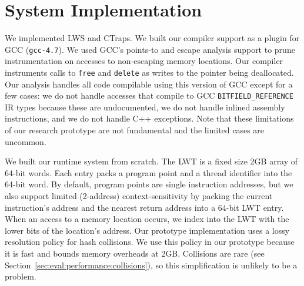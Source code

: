 \documentclass[10pt,nocopyrightspace]{sigplanconf}
\newcommand{\ctraps}{CTraps\xspace}
\newcommand{\lws}{LWS\xspace}
\begin{document}

\section{System Implementation}
\label{sec:implementation}
We implemented \lws and \ctraps.  We built our compiler support
as a plugin for GCC ({\tt gcc-4.7}).  We used GCC's points-to and
escape analysis support to prune instrumentation on accesses to non-escaping memory
locations.  Our compiler instruments calls to {\tt free} and {\tt delete} as
writes to the pointer being deallocated.  Our analysis handles all code
compilable using this version of GCC except for a few cases: we do not handle
accesses that compile to GCC {\tt BITFIELD\_REFERENCE} IR types because these
are undocumented, we do not handle inlined assembly instructions, and we do not
handle C++ exceptions.  Note that these limitations of our research prototype
are not fundamental and the limited cases are uncommon.   

We built our runtime system from scratch.  The LWT is a fixed size 2GB array of
64-bit words.  Each entry packs a program point and a thread identifier into
the 64-bit word.  By default, program points are single instruction addresses,
but we also support limited (2-address) context-sensitivity by packing the
current instruction's address and the nearest return address into a 64-bit LWT
entry. When an access to a memory location occurs, we index into the LWT with
the lower bits of the location's address.  Our prototype implementation uses a
lossy resolution policy for hash collisions.  We use this policy in our
prototype because it is fast and bounds memory overheads at 2GB.  Collisions
are rare (see Section~\ref{sec:eval:performance:collisions}), so this
simplification is unlikely to be a problem.  
\end{document}
